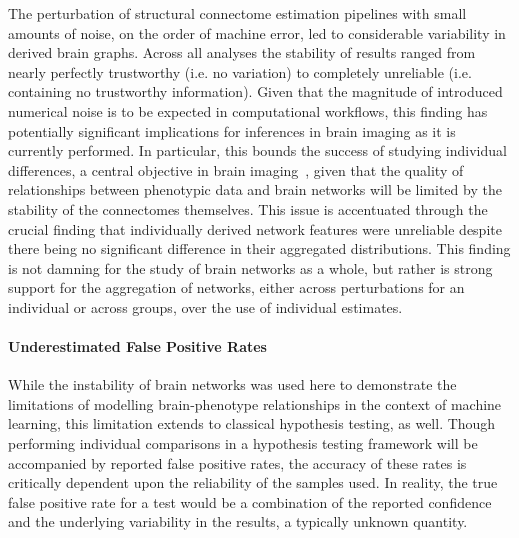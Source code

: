 \documentclass[fleqn,10pt]{SelfArx} %
\newcommand{\new}[1]{{\color{blue} #1}}
\begin{document}
The perturbation of structural connectome estimation pipelines with small amounts of noise, on the order of machine
error, led to considerable variability in derived brain graphs. Across all analyses the stability of results ranged
from nearly perfectly trustworthy (i.e. no variation) to completely unreliable (i.e. containing no trustworthy
information). Given that the magnitude of introduced numerical noise is to be expected \new{in computational workflows}, this
finding has potentially significant implications for inferences in brain imaging as it is currently performed. In
particular, this bounds the success of studying individual differences, a central objective in brain
imaging~\cite{Dubois2016-yr}, given that the quality of relationships between phenotypic data and brain networks will
be limited by the stability of the connectomes themselves. This issue is accentuated through the crucial finding that
individually derived network features were unreliable despite there being no significant difference in their aggregated
distributions. This finding is not damning for the study of brain networks as a whole, but rather is strong support for
the aggregation of networks, either across perturbations for an individual or across groups, over the use of individual
estimates.

\paragraph{Underestimated False Positive Rates}
While the instability of brain networks was used here to demonstrate the limitations of modelling brain-phenotype
relationships in the context of machine learning, this limitation extends to classical hypothesis testing, as well.
Though performing individual comparisons in a hypothesis testing framework will be accompanied by reported false
positive rates, the accuracy of these rates is critically dependent upon the reliability of the samples used. In
reality, the true false positive rate for a test would be a combination of the reported confidence and the underlying
variability in the results, a typically unknown quantity.
\end{document}
